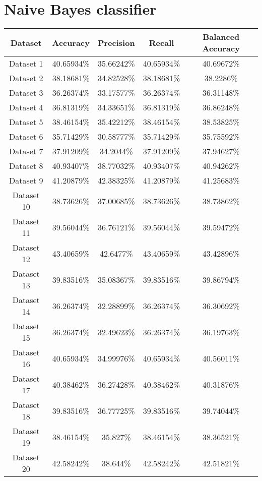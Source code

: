\section{Naive Bayes classifier}
\begin{center}
\begin{tabular}{ |c||c|c|c|c| } 
    \hline
    Dataset & Accuracy & Precision & Recall & Balanced Accuracy\\ 
    \hline\hline
    Dataset 1&40.65934\%&35.66242\%&40.65934\%&40.69672\%\\
    \hline
    Dataset 2&38.18681\%&34.82528\%&38.18681\%&38.2286\%\\
    \hline
    Dataset 3&36.26374\%&33.17577\%&36.26374\%&36.31148\%\\
    \hline
    Dataset 4&36.81319\%&34.33651\%&36.81319\%&36.86248\%\\
    \hline
    Dataset 5&38.46154\%&35.42212\%&38.46154\%&38.53825\%\\
    \hline
    Dataset 6&35.71429\%&30.58777\%&35.71429\%&35.75592\%\\
    \hline
    Dataset 7&37.91209\%&34.2044\%&37.91209\%&37.94627\%\\
    \hline
    Dataset 8&40.93407\%&38.77032\%&40.93407\%&40.94262\%\\
    \hline
    Dataset 9&41.20879\%&42.38325\%&41.20879\%&41.25683\%\\
    \hline
    Dataset 10&38.73626\%&37.00685\%&38.73626\%&38.73862\%\\
    \hline
    Dataset 11&39.56044\%&36.76121\%&39.56044\%&39.59472\%\\
    \hline
    Dataset 12&43.40659\%&42.6477\%&43.40659\%&43.42896\%\\
    \hline
    Dataset 13&39.83516\%&35.08367\%&39.83516\%&39.86794\%\\
    \hline
    Dataset 14&36.26374\%&32.28899\%&36.26374\%&36.30692\%\\
    \hline
    Dataset 15&36.26374\%&32.49623\%&36.26374\%&36.19763\%\\
    \hline
    Dataset 16&40.65934\%&34.99976\%&40.65934\%&40.56011\%\\
    \hline
    Dataset 17&40.38462\%&36.27428\%&40.38462\%&40.31876\%\\
    \hline
    Dataset 18&39.83516\%&36.77725\%&39.83516\%&39.74044\%\\
    \hline
    Dataset 19&38.46154\%&35.827\%&38.46154\%&38.36521\%\\
    \hline
    Dataset 20&42.58242\%&38.644\%&42.58242\%&42.51821\%\\

\end{tabular}
\end{center}
